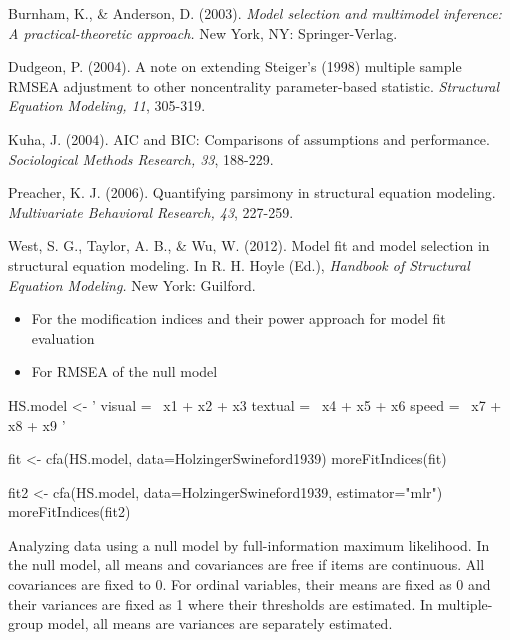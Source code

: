 \documentclass[a4paper]{book}
\begin{document}
\begin{References}\relax
Burnham, K., \& Anderson, D. (2003). \emph{Model selection and multimodel inference: A practical-theoretic approach.} New York, NY: Springer-Verlag.

Dudgeon, P. (2004). A note on extending Steiger's (1998) multiple sample RMSEA adjustment to other noncentrality parameter-based statistic. \emph{Structural Equation Modeling, 11}, 305-319.

Kuha, J. (2004). AIC and BIC: Comparisons of assumptions and performance. \emph{Sociological Methods Research, 33}, 188-229.

Preacher, K. J. (2006). Quantifying parsimony in structural equation modeling. \emph{Multivariate Behavioral Research, 43}, 227-259.

West, S. G., Taylor, A. B., \& Wu, W. (2012). Model fit and model selection in structural equation modeling. In R. H. Hoyle (Ed.), \emph{Handbook of Structural Equation Modeling.} New York: Guilford.
\end{References}
%
\begin{SeeAlso}\relax
\begin{itemize}

\item {} For the modification indices and their power approach for model fit evaluation
\item {} For RMSEA of the null model

\end{itemize}

\end{SeeAlso}
%
\begin{Examples}
\begin{ExampleCode}
HS.model <- ' visual  =~ x1 + x2 + x3
              textual =~ x4 + x5 + x6
              speed   =~ x7 + x8 + x9 '

fit <- cfa(HS.model, data=HolzingerSwineford1939)
moreFitIndices(fit)

fit2 <- cfa(HS.model, data=HolzingerSwineford1939, estimator="mlr")
moreFitIndices(fit2)
\end{ExampleCode}
\end{Examples}
%
\begin{Description}\relax
Analyzing data using a null model by full-information maximum likelihood. In the null model, all means and covariances are free if items are continuous. All covariances are fixed to 0. For ordinal variables, their means are fixed as 0 and their variances are fixed as 1 where their thresholds are estimated. In multiple-group model, all means are variances are separately estimated. 
\end{Description}
\end{document}
